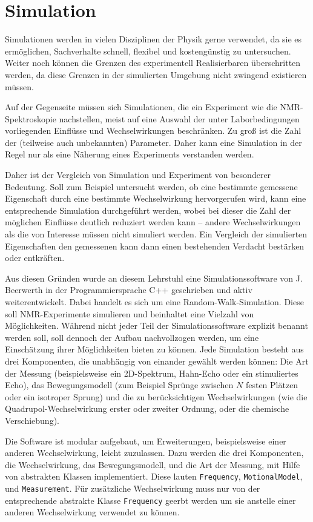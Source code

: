 \chapter{Simulation}\label{chapter:simulation}

Simulationen werden in vielen Disziplinen der Physik gerne verwendet, da sie es ermöglichen, Sachverhalte schnell, flexibel und kostengünstig zu untersuchen. Weiter noch können die Grenzen des experimentell Realisierbaren überschritten werden, da diese Grenzen in der simulierten Umgebung nicht zwingend existieren müssen.

Auf der Gegenseite müssen sich Simulationen, die ein Experiment wie die NMR-Spektroskopie nachstellen, meist auf eine Auswahl der unter Laborbedingungen vorliegenden Einflüsse und Wechselwirkungen beschränken. Zu groß ist die Zahl der (teilweise auch unbekannten) Parameter. Daher kann eine Simulation in der Regel nur als eine Näherung eines Experiments verstanden werden.

Daher ist der Vergleich von Simulation und Experiment von besonderer Bedeutung. Soll zum Beispiel untersucht werden, ob eine bestimmte gemessene Eigenschaft durch eine bestimmte Wechselwirkung hervorgerufen wird, kann eine entsprechende Simulation durchgeführt werden, wobei bei dieser die Zahl der möglichen Einflüsse deutlich reduziert werden kann -- andere Wechselwirkungen als die von Interesse müssen nicht simuliert werden. Ein Vergleich der simulierten Eigenschaften den gemessenen kann dann einen bestehenden Verdacht bestärken oder entkräften.


Aus diesen Gründen wurde an diesem Lehrstuhl eine Simulationssoftware von J. Beerwerth in der Programmiersprache C++ geschrieben und aktiv weiterentwickelt. Dabei handelt es sich um eine Random-Walk-Simulation. Diese soll NMR-Experimente simulieren und beinhaltet eine Vielzahl von Möglichkeiten. Während nicht jeder Teil der Simulationssoftware explizit benannt werden soll, soll dennoch der Aufbau nachvollzogen werden, um eine Einschätzung ihrer Möglichkeiten bieten zu können. Jede Simulation besteht aus drei Komponenten, die unabhängig von einander gewählt werden können: Die Art der Messung (beispielsweise ein 2D-Spektrum, Hahn-Echo oder ein stimuliertes Echo), das Bewegungsmodell (zum Beispiel Sprünge zwischen $N$ festen Plätzen oder ein isotroper Sprung) und die zu berücksichtigen Wechselwirkungen (wie die Quadrupol-Wechselwirkung erster oder zweiter Ordnung, oder die chemische Verschiebung).

Die Software ist modular aufgebaut, um Erweiterungen, beispielsweise einer anderen Wechselwirkung, leicht zuzulassen. Dazu werden die drei Komponenten, die Wechselwirkung, das Bewegungsmodell, und die Art der Messung, mit Hilfe von abstrakten Klassen implementiert. Diese lauten \texttt{Frequency}, \texttt{MotionalModel}, und \texttt{Measurement}. Für zusätzliche Wechselwirkung muss nur von der entsprechende abstrakte Klasse \texttt{Frequency} geerbt werden um sie anstelle einer anderen Wechselwirkung verwendet zu können.

